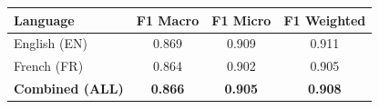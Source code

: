 \begin{tabular}{lccc}
\toprule
\textbf{Language} & \textbf{F1 Macro} & \textbf{F1 Micro} & \textbf{F1 Weighted} \\
\midrule
English (EN) & 0.869 & 0.909 & 0.911 \\
French (FR) & 0.864 & 0.902 & 0.905 \\
\midrule
\textbf{Combined (ALL)} & \textbf{0.866} & \textbf{0.905} & \textbf{0.908} \\
\bottomrule
\end{tabular}